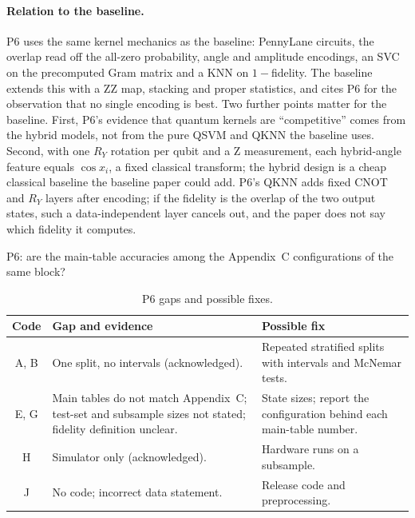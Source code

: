 \documentclass[11pt,a4paper]{article}
\newcommand{\tabdir}{../reimplementation/tex/papers/}
\begin{document}
\paragraph{Relation to the baseline.} P6 uses the same kernel mechanics as the baseline: PennyLane circuits, the overlap read off the all-zero probability, angle and amplitude encodings, an SVC on the precomputed Gram matrix and a KNN on $1-$fidelity. The baseline extends this with a ZZ map, stacking and proper statistics, and cites P6 for the observation that no single encoding is best. Two further points matter for the baseline. First, P6's evidence that quantum kernels are ``competitive'' comes from the hybrid models, not from the pure QSVM and QKNN the baseline uses. Second, with one $R_Y$ rotation per qubit and a Z measurement, each hybrid-angle feature equals $\cos x_i$, a fixed classical transform; the hybrid design is a cheap classical baseline the baseline paper could add. P6's QKNN adds fixed CNOT and $R_Y$ layers after encoding; if the fidelity is the overlap of the two output states, such a data-independent layer cancels out, and the paper does not say which fidelity it computes.

\begin{table}[H]
\centering\footnotesize
\caption{P6: are the main-table accuracies among the Appendix~C configurations of the same block?}
\label{tab:sodar}

\end{table}

\begin{table}[H]
\centering\footnotesize
\caption{P6 gaps and possible fixes.}
\begin{tabularx}{\textwidth}{c Y Y}
\toprule
Code & Gap and evidence & Possible fix \\
\midrule
A, B & One split, no intervals (acknowledged). & Repeated stratified splits with intervals and McNemar tests. \\
E, G & Main tables do not match Appendix~C; test-set and subsample sizes not stated; fidelity definition unclear. & State sizes; report the configuration behind each main-table number. \\
H & Simulator only (acknowledged). & Hardware runs on a subsample. \\
J & No code; incorrect data statement. & Release code and preprocessing. \\
\bottomrule
\end{tabularx}
\end{table}
\end{document}
